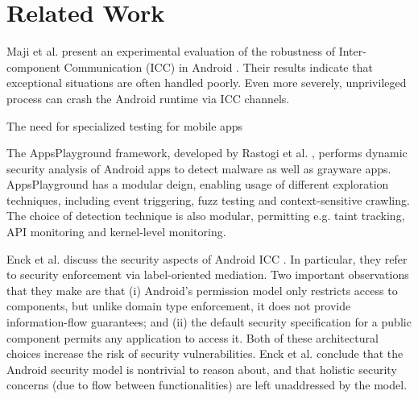 \section{Related Work}\label{Se:related}


Maji et al. present an experimental evaluation of the robustness of Inter-component Communication (ICC) in Android \cite{MAB:DSN12}. Their results indicate that exceptional situations are often handled poorly. Even more severely, unprivileged process can crash the Android runtime via ICC channels. 


The need for specialized testing for mobile apps


The AppsPlayground framework, developed by Rastogi et al. \cite{RCE:CODAPSY13}, performs dynamic security analysis of Android apps to detect malware as well as grayware apps.  AppsPlayground has a modular deign, enabling usage of different exploration techniques, including event triggering, fuzz testing and context-sensitive crawling. The choice of detection technique is also modular, permitting e.g. taint tracking, API monitoring and kernel-level monitoring.


Enck et al. discuss the security aspects of Android ICC \cite{EOM:SP09}. In particular, they refer to security enforcement via label-oriented mediation. Two important observations that they make are that (i) Android's permission model only restricts access to components, but unlike domain type enforcement, it does not provide information-flow guarantees; and (ii) the default security specification for a public component permits any application to access it. Both of these architectural choices increase the risk of security vulnerabilities. Enck et al. conclude that the Android security model is nontrivial to reason about, and that holistic security concerns (due to flow between functionalities) are left unaddressed by the model.


